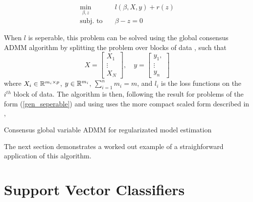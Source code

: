 \documentclass[11pt]{article}
\begin{document}
\begin{equation}
\begin{aligned}
    \min_{\beta, z} \quad & {l(\beta, X, y) + r(z)} \\
    \textrm{subj. to} \quad & \beta - z = 0
\end{aligned}
\end{equation}

When $l$ is seperable, this problem can be solved using the global consensus ADMM algorithm by splitting
the problem over blocks of data \cite{boydistributed}, such that
\[
    X = \begin{bmatrix} X_1 \\ \vdots \\ X_N \end{bmatrix}, \quad
    y = \begin{bmatrix} y_1, \\ \vdots \\ y_n\end{bmatrix}
\]
where $X_i \in \mathbb{R}^{m_i \times p}$, $y \in \mathbb{R}^{m_i}$, $\sum_{i=1}^n m_i = m$, and $l_i$ is 
the loss functions on the $i^{th}$ block of data.
The algorithm is then, following the result for problems of the form (\ref{gen_seperable})
and using uses the more compact scaled form described in \cite{boydistributed},\\

\begin{algorithm}[H]
    \caption{Consensus global variable ADMM for regularizated model estimation}

    \SetAlgoNoLine

\end{algorithm}
\vspace{5pt}
The next section demonstrates a worked out example of a straighforward application of this algorithm.

\section{Support Vector Classifiers}
\end{document}
